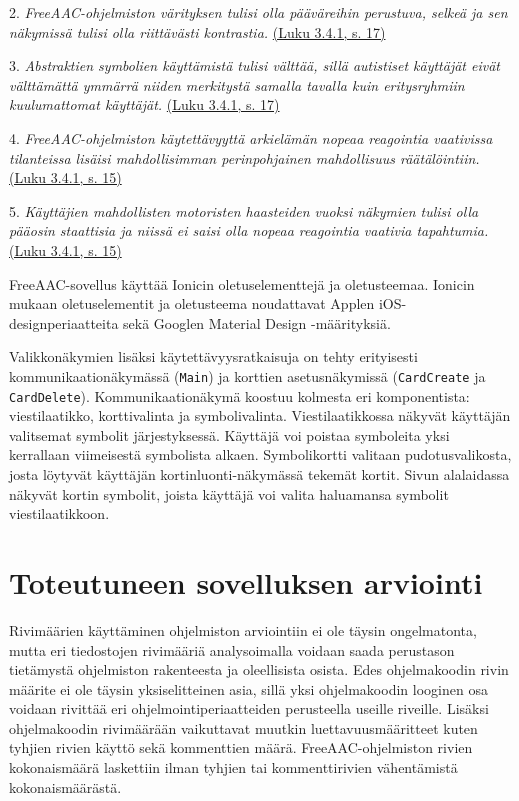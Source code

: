 \documentclass[utf8]{gradu3}
\begin{document}
2. \textit{FreeAAC-ohjelmiston värityksen tulisi olla pääväreihin perustuva, selkeä ja sen näkymissä tulisi olla riittävästi kontrastia.} \hyperref[AAC-colors]{(Luku 3.4.1, s. 17)}

3. \textit{Abstraktien symbolien käyttämistä tulisi välttää, sillä autistiset käyttäjät eivät välttämättä ymmärrä niiden merkitystä samalla tavalla kuin eritysryhmiin kuulumattomat käyttäjät.} \hyperref[AAC-abstract-symbols]{(Luku 3.4.1, s. 17)}

4. \textit{FreeAAC-ohjelmiston käytettävyyttä arkielämän nopeaa reagointia vaativissa tilanteissa lisäisi mahdollisimman perinpohjainen mahdollisuus räätälöintiin.} \hyperref[AAC-context-settings]{(Luku 3.4.1, s. 15)}

5. \textit{Käyttäjien mahdollisten motoristen haasteiden vuoksi näkymien tulisi olla pääosin staattisia ja niissä ei saisi olla nopeaa reagointia vaativia tapahtumia.} \hyperref[AAC-staticity]{(Luku 3.4.1, s. 15)}

FreeAAC-sovellus käyttää Ionicin oletuselementtejä ja oletusteemaa. Ionicin mukaan oletuselementit ja oletusteema noudattavat Applen iOS-designperiaatteita sekä Googlen Material Design -määrityksiä.  

Valikkonäkymien lisäksi käytettävyysratkaisuja on tehty erityisesti kommunikaationäkymässä (\texttt{Main}) ja korttien asetusnäkymissä (\texttt{CardCreate} ja \texttt{CardDelete}). Kommunikaationäkymä koostuu kolmesta eri komponentista: viestilaatikko, korttivalinta ja symbolivalinta. Viestilaatikkossa näkyvät käyttäjän valitsemat symbolit järjestyksessä. Käyttäjä voi poistaa symboleita yksi kerrallaan viimeisestä symbolista alkaen. Symbolikortti valitaan pudotusvalikosta, josta löytyvät käyttäjän kortinluonti-näkymässä tekemät kortit. Sivun alalaidassa näkyvät kortin symbolit, joista käyttäjä voi valita haluamansa symbolit viestilaatikkoon.

\chapter{Toteutuneen sovelluksen arviointi}

Rivimäärien käyttäminen ohjelmiston arviointiin ei ole täysin ongelmatonta, mutta eri tiedostojen rivimääriä analysoimalla voidaan saada perustason tietämystä ohjelmiston rakenteesta ja oleellisista osista. Edes ohjelmakoodin rivin määrite ei ole täysin yksiselitteinen asia, sillä yksi ohjelmakoodin looginen osa voidaan rivittää eri ohjelmointiperiaatteiden perusteella useille riveille. Lisäksi ohjelmakoodin rivimäärään vaikuttavat muutkin luettavuusmääritteet kuten tyhjien rivien käyttö sekä kommenttien määrä. FreeAAC-ohjelmiston rivien kokonaismäärä laskettiin ilman tyhjien tai kommenttirivien vähentämistä kokonaismäärästä.
\end{document}
